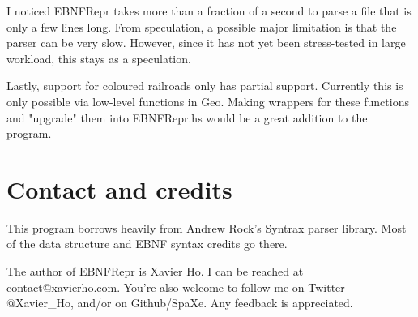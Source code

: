 \documentclass[a4paper]{article}
\begin{document}
I noticed EBNFRepr takes more than a fraction of a second to parse a file that is only a few lines long. From speculation, a possible major limitation is that the parser can be very slow. However, since it has not yet been stress-tested in large workload, this stays as a speculation.

Lastly, support for coloured railroads only has partial support. Currently this is only possible via low-level functions in Geo. Making wrappers for these functions and "upgrade" them into EBNFRepr.hs would be a great addition to the program.

\section{Contact and credits}
This program borrows heavily from Andrew Rock's Syntrax parser library. Most of the data structure and EBNF syntax credits go there.

The author of EBNFRepr is Xavier Ho. I can be reached at contact@xavierho.com. You're also welcome to follow me on Twitter @Xavier\_Ho, and/or on Github/SpaXe. Any feedback is appreciated.
\end{document}
